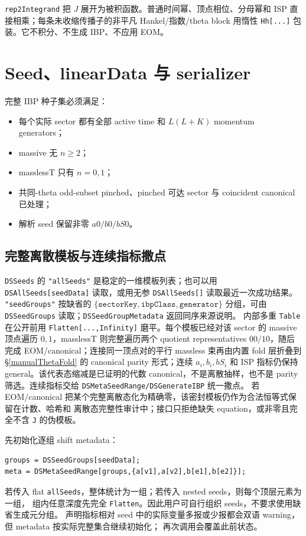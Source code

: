 ﻿\documentclass[a4paper,11pt]{article}
\begin{document}
\texttt{rep2Integrand} 把 $J$ 展开为被积函数。普通时间幂、顶点相位、分母幂和 ISP 直接相乘；每条未收缩传播子的非平凡 Hankel/指数/theta block 用惰性 \texttt{Hh[...]} 包装。它不积分、不生成 IBP、不应用 EOM。

\section{Seed、linearData 与 serializer}

完整 IBP 种子集必须满足：
\begin{itemize}
  \item 每个实际 sector 都有全部 active time 和 $L(L+K)$ momentum generators；
  \item massive 无 $n\ge2$；
  \item masslessT 只有 $n=0,1$；
  \item 共同-theta odd-subset pinched、pinched 可达 sector 与 coincident canonical 已处理；
  \item 解析 seed 保留非零 $a0/b0/bS0$。
\end{itemize}

\subsection{完整离散模板与连续指标撒点}

\texttt{DSSeeds} 的 \texttt{"allSeeds"} 是稳定的一维模板列表；也可以用
\texttt{DSAllSeeds[seedData]} 读取，或用无参 \texttt{DSAllSeeds[]} 读取最近一次成功结果。
\texttt{"seedGroups"} 按缺省的 $\{\texttt{sectorKey},\texttt{ibpClass},\texttt{generator}\}$
分组，可由 \texttt{DSSeedGroups} 读取；\texttt{DSSeedGroupMetadata} 返回同序来源说明。
内部多重 \texttt{Table} 在公开前用 \texttt{Flatten[...,Infinity]} 磨平。每个模板已经对该
sector 的 massive 顶点遍历 $0,1$，masslessT 则完整遍历两个 quotient representatives $00/10$，随后完成 EOM/canonical；连接同一顶点对的平行 massless 束再由内置 fold 层折叠到 \S\ref{manualThetaFold} 的 canonical parity 形式；连续 $a_i,b_i,bS_i$ 和 ISP 指标仍保持 general。该代表态缩减是已证明的代数 canonical，不是离散抽样，也不是 parity 筛选。连续指标交给
\texttt{DSMetaSeedRange/DSGenerateIBP} 统一撒点。
若 EOM/canonical 把某个完整离散态化为精确零，该密封模板仍作为合法恒等式保留在计数、哈希和
离散态完整性审计中；接口只拒绝缺失 equation，或非零且完全不含 \texttt{J} 的伪模板。

先初始化逐组 shift metadata：
\begin{verbatim}
groups = DSSeedGroups[seedData];
meta = DSMetaSeedRange[groups,{a[v1],a[v2],b[e1],b[e2]}];
\end{verbatim}
若传入 flat \texttt{allSeeds}，整体统计为一组；若传入 nested seeds，则每个顶层元素为一组，
组内任意深度先完全 \texttt{Flatten}。因此用户可自行组织 seeds，不要求使用缺省生成元分组。
声明指标相对 seed 中的实际变量多报或少报都会双语 warning，但 metadata 按实际完整集合继续初始化；
再次调用会覆盖此前状态。
\end{document}
